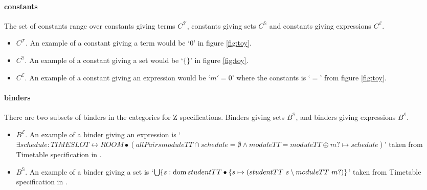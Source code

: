 \paragraph{constants}
\label{subsubsec:costants}

The set of constants range over constants giving terms $C^{\mathcal{T}}$,
constants giving sets $C^{\mathbb{S}}$ and constants giving expressions
$C^{\mathcal{E}}$.

\begin{itemize} 
\item $C^{\mathcal{T}}$. An example of a constant giving a term would be `$0$'
in figure \ref{fig:toy}.

\item $C^{\mathbb{S}}$. An example of a constant giving a set would be `$\{\}$'
in figure \ref{fig:toy}.

\item $C^{\mathcal{E}}$. An example of a constant giving an expression would be
`$m' = 0$' where the constants is `$=$' from figure \ref{fig:toy}.
\end{itemize}

\paragraph{binders}
\label{subsubsec:binders}

There are two subsets of binders in the categories for Z specifications. Binders
giving sets $B^{\mathbb{S}}$, and binders giving expressions $B^{\mathcal{E}}$.

\begin{itemize}
\item $B^{\mathcal{E}}$. An example of a binder giving an expression is 
\newline
\noindent `$\exists schedule:TIMESLOT \leftrightarrow ROOM \bullet (allPairs
moduleTT \cap schedule = \emptyset \land moduleTT = moduleTT \oplus {m? \mapsto
schedule})$'
\newline
\noindent taken from Timetable specification in \cite{mathlangexamples}.

\item $B^{\mathbb{S}}$. An example of a binder giving a set is
\newline
\noindent `$\bigcup \{s:\mathop{\mathrm{dom}} studentTT \bullet \{s \mapsto (studentTT~s
\setminus moduleTT~m?)\}$' \newline
\noindent taken from Timetable specification in \cite{mathlangexamples}.
\end{itemize}

